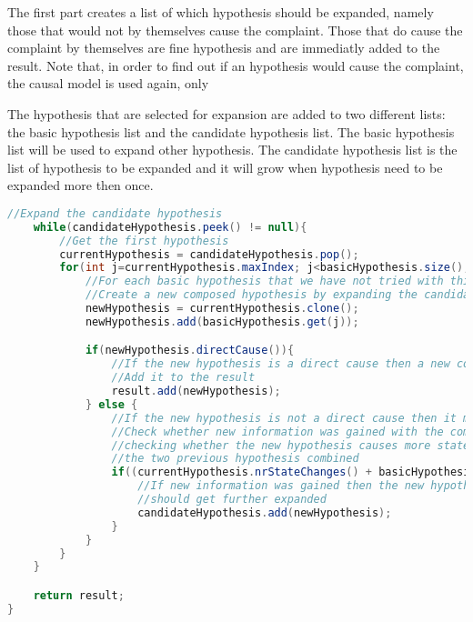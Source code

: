 The first part creates a list of which hypothesis should be expanded, namely those that would not by themselves cause the complaint. Those that do cause the complaint by themselves are fine hypothesis and are immediatly added to the result. Note that, in order to find out if an hypothesis would cause the complaint, the causal model is used again, only 

The hypothesis that are selected for expansion are added to two different lists: the basic hypothesis list and the candidate hypothesis list. The basic hypothesis list will be used to expand other hypothesis. The candidate hypothesis list is the list of hypothesis to be expanded and it will grow when  hypothesis need to be expanded more then once.

\begin{lstlisting}[language=Java]
    //Expand the candidate hypothesis
    while(candidateHypothesis.peek() != null){
        //Get the first hypothesis
        currentHypothesis = candidateHypothesis.pop();
        for(int j=currentHypothesis.maxIndex; j<basicHypothesis.size(); j++){
            //For each basic hypothesis that we have not tried with this combination
            //Create a new composed hypothesis by expanding the candidate with the basic hypothesis
            newHypothesis = currentHypothesis.clone();
            newHypothesis.add(basicHypothesis.get(j));

            if(newHypothesis.directCause()){
                //If the new hypothesis is a direct cause then a new composed hypothesis has been found
                //Add it to the result
                result.add(newHypothesis);
            } else {
                //If the new hypothesis is not a direct cause then it might need further expanding.
                //Check whether new information was gained with the composed hypothesis by
                //checking whether the new hypothesis causes more state changes then
                //the two previous hypothesis combined
                if((currentHypothesis.nrStateChanges() + basicHypothesis.get(j).nrStateChanges() < newHypothesis.nrStateChanges())){
                    //If new information was gained then the new hypothesis
                    //should get further expanded
                    candidateHypothesis.add(newHypothesis);
                }
            }
        }
    }

    return result;
}
\end{lstlisting}
